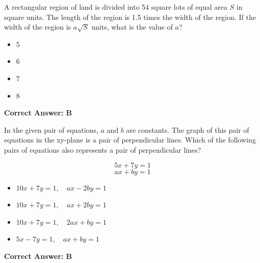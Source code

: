 \documentclass{article}
\begin{document}
\begin{tcolorbox}[colback=blue!5!white,colframe=blue!75!black,title=Question 1]
A rectangular region of land is divided into 54 square lots of equal area \( S \) in square units. The length of the region is 1.5 times the width of the region. If the width of the region is \( a\sqrt{S} \) units, what is the value of \( a \)?

\begin{itemize}
    \item[A.] 5
    \item[B.] 6
    \item[C.] 7
    \item[D.] 8
\end{itemize}
\end{tcolorbox}

\begin{tcolorbox}[colback=green!10, colframe=green!50!black,title=Answer to Question 1]
\textbf{Correct Answer: B}  
\end{tcolorbox}




\vspace{20pt}

\begin{tcolorbox}[colback=blue!5!white,colframe=blue!75!black,title=Question 2]
In the given pair of equations, \( a \) and \( b \) are constants. The graph of this pair of equations in the xy-plane is a pair of perpendicular lines. Which of the following pairs of equations also represents a pair of perpendicular lines?

\[
5x + 7y = 1
\]
\[
ax + by = 1
\]

\begin{itemize}
    \item[A.] \( 10x + 7y = 1, \quad ax - 2by = 1 \)
    \item[B.] \( 10x + 7y = 1, \quad ax + 2by = 1 \)
    \item[C.] \( 10x + 7y = 1, \quad 2ax + by = 1 \)
    \item[D.] \( 5x - 7y = 1, \quad ax + by = 1 \)
\end{itemize}
\end{tcolorbox}

\begin{tcolorbox}[colback=green!10, colframe=green!50!black,title=Answer to Question 2]
\textbf{Correct Answer: B}  
\end{tcolorbox}

\vspace{20pt}
\end{document}
